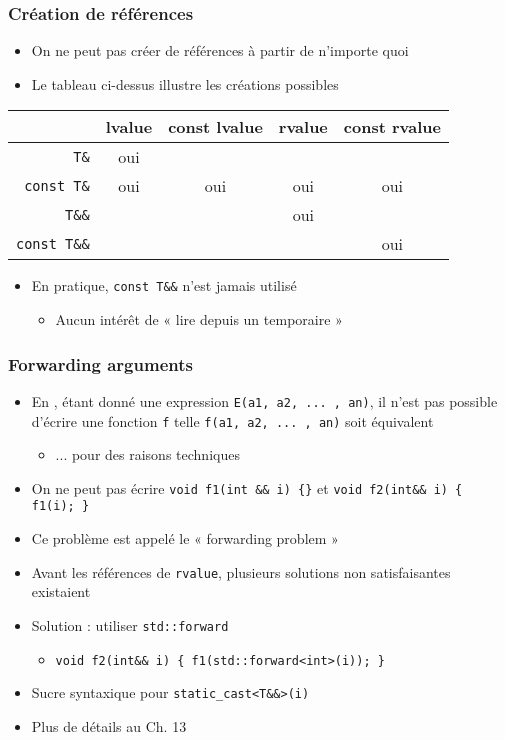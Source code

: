 \begin{frame}
\frametitle{Création de références}
\begin{itemize}
 \item On ne peut pas créer de références à partir de n'importe quoi
 \item Le tableau ci-dessus illustre les créations possibles
\end{itemize}
\centering
\begin{tabular}{|r|cccc|}
\hline
                      & lvalue & const lvalue & rvalue & const rvalue \\
\hline
\texttt{T\&}          & oui    &              &        &              \\
\texttt{const T\&}    & oui    & oui          & oui    & oui          \\
\texttt{T\&\&}        &        &              & oui    &              \\
\texttt{const T\&\&}  &        &              &        & oui          \\
\hline
\end{tabular}
\begin{itemize}
 \item En pratique, \lstinline|const T&&| n'est jamais utilisé
	\begin{itemize}
	 \item Aucun intérêt de « lire depuis un temporaire »
	\end{itemize}
\end{itemize}
\end{frame}

\begin{frame}[containsverbatim]
\frametitle{Forwarding arguments}
\begin{itemize}
\item En \cpp,  étant donné une expression \texttt{E(a1, a2, ... , an)}, il n'est pas possible d'écrire une fonction \texttt{f} telle \linebreak \texttt{f(a1, a2, ... , an)} soit équivalent
	\begin{itemize}
	\item ... pour des raisons techniques
	\end{itemize}
\item On ne peut pas écrire \lstinline|void f1(int && i) {}| et \lstinline|void f2(int&& i) { f1(i); }|
\item Ce problème est appelé le « forwarding problem »
\item Avant les références de \texttt{rvalue}, plusieurs solutions non satisfaisantes existaient
\item Solution : utiliser \texttt{std::forward}
	\begin{itemize}
	\item \lstinline|void f2(int&& i) { f1(std::forward<int>(i)); }|
	\end{itemize}
\item Sucre syntaxique pour \lstinline|static_cast<T&&>(i)|
\item Plus de détails au Ch. 13
\end{itemize}
\end{frame}

